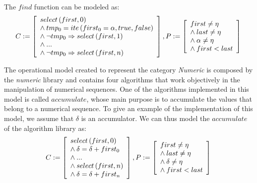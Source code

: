 \documentclass[a4paper]{llncs}
\begin{document}
%
The $find$ function can be modeled as:
%
\begin{equation}
\label{quantifier-free-formulae-find}
C := \left [ \begin{array}{ll}
            select\left(first, 0\right) \\
	    \wedge \:tmp_{0} = ite\left(first_{0} = \alpha, true,  false\right) \\
            \wedge \:\neg tmp_{0} \Rightarrow select\left(first, 1\right) \\
            \wedge \:... \\
            \wedge \:\neg tmp_{0} \Rightarrow select\left(first, n\right) \\
              \end{array} \right ],  \\
P := \left [ \begin{array}{ll}
            first \neq \eta \\
	    \wedge \:last \neq \eta \\
	    \wedge \:\alpha \neq \eta \\
	    \wedge \:first < last \\
              \end{array} \right ]  \\
\end{equation}
%

The operational model created to represent the category \textit{Numeric} is
composed by the \textit{numeric} library and contains four algorithms that work
objectively in the manipulation of numerical sequences. One of the algorithms
implemented in this model is called $accumulate$, whose main purpose is
to accumulate the values that belong to a numerical sequence. To give an example
of the implementation of this model, we assume that $\delta$ is an accumulator.
We can thus model the $accumulate$ of the algorithm library as:
%
\begin{equation}
\label{quantifier-free-formulae-accumulate}
C := \left [ \begin{array}{ll}
            select\left(first, 0\right) \\
            \wedge \:\delta = \delta + first_{0}\\
            \wedge \:... \\
            \wedge \:select\left(first, n\right) \\
            \wedge \:\delta = \delta + first_{n} \\
              \end{array} \right ],  \\
P := \left [ \begin{array}{ll}
            first \neq \eta \\
	    \wedge \:last \neq \eta \\
	    \wedge \:\delta \neq \eta \\
	    \wedge \:first < last \\
              \end{array} \right ]  \\
\end{equation}
\end{document}

